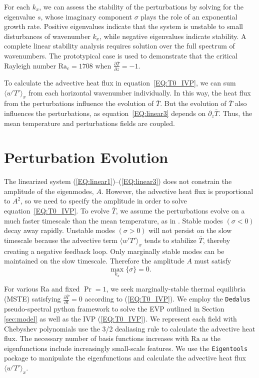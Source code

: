 \documentclass[reprint,amsmath,amssymb,aps]{revtex4-1}
\newcommand\Ra{\mathrm{Ra}}
\newcommand{\eq}[1]{(\ref{#1})}
\newcommand{\eqss}[2]{(\ref{#1})--(\ref{#2})}
\begin{document}
For each $k_x$, we can assess the stability of the perturbations by solving for the eigenvalue $s$, whose imaginary component $\sigma$ plays the role of an exponential growth rate. 
Positive eigenvalues indicate that the system is unstable to small disturbances of wavenumber $k_x$, while negative eigenvalues indicate stability. 
A complete linear stability analysis requires solution over the full spectrum of wavenumbers. 
The prototypical case is used to demonstrate that the critical Rayleigh number $\Ra_c = 1708$ when $\frac{\partial \bar{T}}{\partial z} = -1$.

To calculate the advective heat flux in equation~\ref{EQ:T0_IVP}, we can sum $\langle w'T' \rangle_x$ from each horizontal wavenumber individually.
In this way, the heat flux from the perturbations influence the evolution of $\bar{T}$.
But the evolution of $\bar{T}$ also influences the perturbations, as equation~\ref{EQ:linear3} depends on $\partial_z \bar{T}$.
Thus, the mean temperature and perturbations fields are coupled.

\section{Perturbation Evolution}\label{sec:evolution}
The linearized system \eqss{EQ:linear1}{EQ:linear3} does not constrain the amplitude of the eigenmodes, $A$.
However, the advective heat flux is proportional to $A^2$, so we need to specify the amplitude in order to solve equation~\ref{EQ:T0_IVP}.
To evolve $\bar{T}$, we assume the perturbations evolve on a much faster timescale than the mean temperature, as in \cite{michel_chini_2019}.
Stable modes $(\sigma < 0)$ decay away rapidly. 
Unstable modes $(\sigma > 0)$ will not persist on the slow timescale because the advective term $\langle w'T' \rangle_x$ tends to stabilize $\bar{T}$, thereby creating a negative feedback loop.
Only marginally stable modes can be maintained on the slow timescale.
Therefore the amplitude $A$ must satisfy
\begin{equation}
    \max_{k_x} \{ \sigma \} = 0.
\end{equation}

For various $\Ra$ and fixed $\Pr = 1$, we seek marginally-stable thermal equilibria (MSTE) satisfying $\frac{\partial \bar{T}}{\partial t} = 0$ according to \eq{EQ:T0_IVP}. 
We employ the \texttt{Dedalus} pseudo-spectral python framework \cite{Dedalus_2020} to solve the EVP outlined in Section \ref{sec:model} as well as the IVP \eq{EQ:T0_IVP}.
We represent each field with Chebyshev polynomials use the 3/2 dealiasing rule to calculate the advective heat flux.
The necessary number of basis functions increases with $\Ra$ as the eigenfunctions include increasingly small-scale features. 
We use the \texttt{Eigentools} package \cite{Eigentools} to manipulate the eigenfunctions and calculate the advective heat flux $\langle w' T' \rangle_x$.
\end{document}
